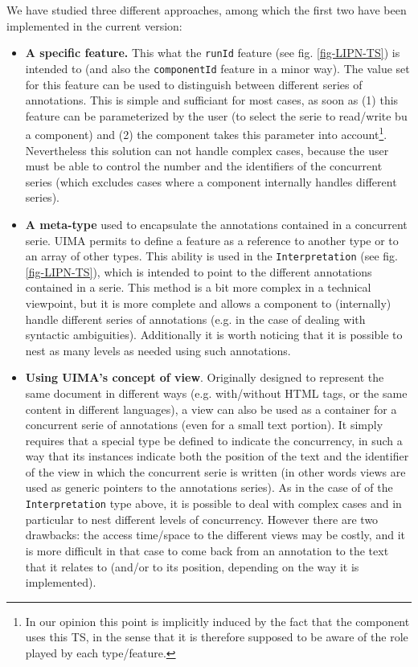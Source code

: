 \documentclass{article}
\newenvironment{xitemize}{
\begin{itemize}
  \setlength{\itemsep}{.3\baselineskip}
  \setlength{\topsep}{0pt}
  \setlength{\parskip}{0pt}
  \setlength{\parsep}{0pt}
}{\end{itemize}}
\begin{document}
We have studied three different approaches, among which the first two have been implemented in the current version:

\begin{xitemize}
\item {\bf A specific feature.}  This what the {\tt runId} feature (see fig. \ref{fig-LIPN-TS}) is intended to (and also the {\tt componentId} feature in a minor way). The value set for this feature can be used to distinguish between different series of annotations. This is simple and sufficiant for most cases, as soon as (1) this feature can be parameterized by the user (to select the serie to read/write bu a component) and (2) the component takes this parameter into account\footnote{In our opinion this point is implicitly induced by the fact that the component uses this TS, in the sense that it is therefore supposed to be aware of the role played by each type/feature.}. Nevertheless this solution can not handle complex cases, because the user must be able to control the number and the identifiers of the concurrent series (which excludes cases where a component internally handles different series).
\item {\bf A meta-type} used to encapsulate the annotations contained in a concurrent serie. UIMA permits to define a feature as a reference to another type or to an array of other types. This ability is used in the {\tt Interpretation} (see fig. \ref{fig-LIPN-TS}), which is intended to point to the different annotations contained in a serie. This method is a bit more complex in a technical viewpoint, but it is more complete and allows a component to (internally) handle different series of annotations (e.g. in the case of dealing with syntactic ambiguities). Additionally it is worth noticing that it is possible to nest as many levels as needed using such annotations.
\item {\bf Using UIMA's concept of  view}. Originally designed to represent the same document in different ways (e.g. with/without HTML tags, or the same content in different languages), a view can also be used as a container for a concurrent serie of annotations (even for a small text portion). It simply requires that a special type be defined to indicate the concurrency, in such a way that its instances indicate both the position of the text and the identifier of the view in which the concurrent serie is written (in other words views are used as generic pointers to the annotations series). As in the case of of the {\tt Interpretation} type above, it is possible to deal with complex cases and in particular to nest different levels of concurrency. However there are two drawbacks: the access time/space to the different views may be costly, and it is more difficult in that case to come back from an annotation to the text that it relates to (and/or to its position, depending on the way it is implemented).
\end{xitemize}
\end{document}
